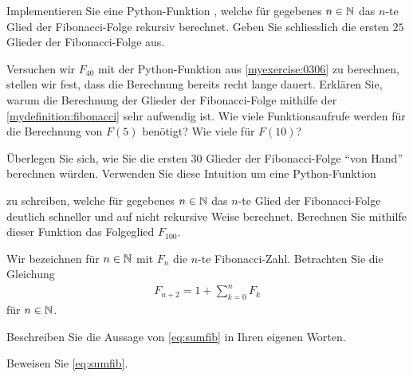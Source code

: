 \clearpage

\begin{myexercise}\label{myexercise:0306}
Implementieren Sie eine Python-Funktion , welche für gegebenes $n\in\mathbb{N}$ das $n$-te Glied der Fibonacci-Folge rekursiv berechnet. Geben Sie schliesslich die ersten $25$ Glieder der Fibonacci-Folge aus.
\end{myexercise}

\begin{myexercise}\label{myexercise:0307}
Versuchen wir $F_{40}$ mit der Python-Funktion aus \cref{myexercise:0306} zu berechnen, stellen wir fest, dass die Berechnung bereits recht lange dauert. Erklären Sie, warum die Berechnung der Glieder der Fibonacci-Folge mithilfe der \cref{mydefinition:fibonacci} sehr aufwendig ist. Wie viele Funktionsaufrufe werden für die Berechnung von $F(5)$ benötigt? Wie viele für $F(10)$?
\end{myexercise}

\begin{myexercise}\label{myexercise:0358}
Überlegen Sie sich, wie Sie die ersten $30$ Glieder der Fibonacci-Folge \enquote{von Hand} berechnen würden. Verwenden Sie diese Intuition um eine Python-Funktion
\begin{center}
\end{center}
zu schreiben, welche für gegebenes $n\in\mathbb{N}$ das $n$-te Glied der Fibonacci-Folge deutlich schneller und auf nicht rekursive Weise berechnet. Berechnen Sie mithilfe dieser Funktion das Folgeglied $F_{100}$.
\end{myexercise}

\begin{myexercise}\label{myexercise:0309}
Wir bezeichnen für $n\in\mathbb{N}$ mit $F_n$ die $n$-te Fibonacci-Zahl. Betrachten Sie die Gleichung
\begin{align}\label{eq:sumfib}
    F_{n+2} = 1 + \sum_{k=0}^{n} F_k
\end{align}
für $n\in\mathbb{N}$.
\begin{aenum}
    \item Beschreiben Sie die Aussage von \cref{eq:sumfib} in Ihren eigenen Worten.
    \item Beweisen Sie \cref{eq:sumfib}.
\end{aenum}
\end{myexercise}

\clearpage
